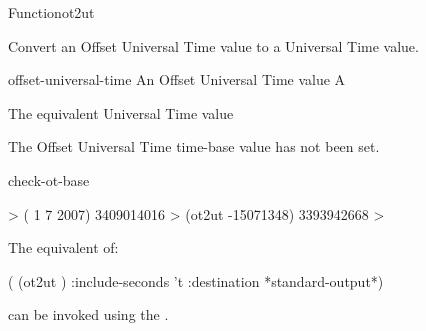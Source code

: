 \documentclass[10pt,twoside,english,pdftex]{article}
\begin{document}
\begin{functiondoc}{Function}{ot2ut}{
    }
%

\fnsyntax

\fnpurpose Convert an Offset Universal Time value to a Universal Time 
value.

\fnpackage {}

\fnmodule {}

\fnargs
\begin{args}{offset-universal-time}
 An Offset Universal Time value
 A 
\end{args}

\fnreturns The equivalent Universal Time value

\fnerrors The Offset Universal Time time-base value has not been set.

\begin{alsos}{check-ot-base}
\also[*ot-base*]
\also[ut2ot]
\end{alsos}

\fnexample
%
\W\supp
\begin{example}
  > ( 1 7 2007)
  3409014016
  > (ot2ut -15071348)
  3393942668
  >
\end{example}

\replnote 
%
%
%
The equivalent of:
%
\W\supp
\begin{example}
  ( (ot2ut ) 
     :include-seconds 't
     :destination *standard-output*)
\end{example} 
%
can be invoked using the  .

\end{functiondoc}

\end{document}
